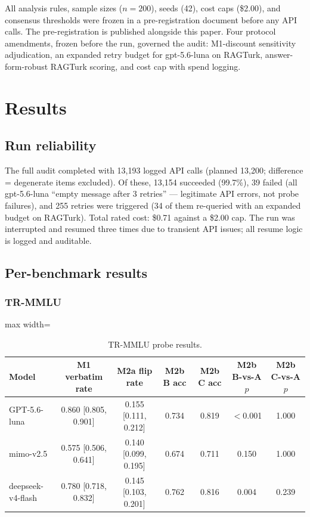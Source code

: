 \documentclass[11pt]{article}
\begin{document}
All analysis rules, sample sizes ($n=200$), seeds (42), cost caps (\$2.00), and consensus thresholds were frozen in a pre-registration document before any API calls. The pre-registration is published alongside this paper. Four protocol amendments, frozen before the run, governed the audit: M1-discount sensitivity adjudication, an expanded retry budget for gpt-5.6-luna on RAGTurk, answer-form-robust RAGTurk scoring, and cost cap with spend logging.

\section{Results}

\subsection{Run reliability}

The full audit completed with 13,193 logged API calls (planned 13,200; difference = degenerate items excluded). Of these, 13,154 succeeded (99.7\%), 39 failed (all gpt-5.6-luna ``empty message after 3 retries'' --- legitimate API errors, not probe failures), and 255 retries were triggered (34 of them re-queried with an expanded budget on RAGTurk). Total rated cost: \$0.71 against a \$2.00 cap. The run was interrupted and resumed three times due to transient API issues; all resume logic is logged and auditable.

\subsection{Per-benchmark results}\label{sec:perbench}

\subsubsection{TR-MMLU}

\begin{table}[t]
\centering
\begin{adjustbox}{max width=\textwidth}
\begin{tabular}{lcccccc}
\toprule
\textbf{Model} & \textbf{M1 verbatim rate} & \textbf{M2a flip rate} & \textbf{M2b B acc} & \textbf{M2b C acc} & \textbf{M2b B-vs-A $p$} & \textbf{M2b C-vs-A $p$} \\
\midrule
GPT-5.6-luna & 0.860 [0.805, 0.901] & 0.155 [0.111, 0.212] & 0.734 & 0.819 & $<$0.001 & 1.000 \\
mimo-v2.5 & 0.575 [0.506, 0.641] & 0.140 [0.099, 0.195] & 0.674 & 0.711 & 0.150 & 1.000 \\
deepseek-v4-flash & 0.780 [0.718, 0.832] & 0.145 [0.103, 0.201] & 0.762 & 0.816 & 0.004 & 0.239 \\
\bottomrule
\end{tabular}%
\end{adjustbox}
\caption{TR-MMLU probe results.}
\label{tab:trmmu}
\end{table}
\end{document}
